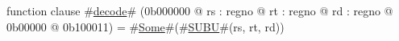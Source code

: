 function clause #\hyperref[zdecode]{decode}# (0b000000 @ rs : regno @ rt : regno @ rd : regno @ 0b00000 @ 0b100011) =
    #\hyperref[zSome]{Some}#(#\hyperref[zSUBU]{SUBU}#(rs, rt, rd))

